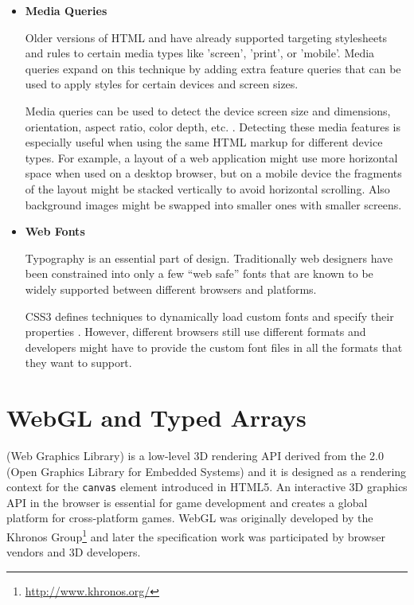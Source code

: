 \begin{itemize}
\item \textbf{Media Queries}

  Older versions of HTML and  have already supported targeting
  stylesheets and rules to certain media types like 'screen', 'print',
  or 'mobile'. Media queries expand on this technique by adding extra
  feature queries that can be used to apply styles for certain devices
  and screen sizes. \cite{mediaqueries}

  Media queries can be used to detect the device screen size and
  dimensions, orientation, aspect ratio, color depth,
  etc. \cite{mediaqueries}. Detecting these media features is especially
  useful when using the same HTML markup for different device types. For
  example, a layout of a web application might use more horizontal space
  when used on a desktop browser, but on a mobile device the fragments
  of the layout might be stacked vertically to avoid horizontal
  scrolling. Also background images might be swapped into smaller ones
  with smaller screens.

\item \textbf{Web Fonts}

  Typography is an essential part of design. Traditionally web designers
  have been constrained into only a few ``web safe'' fonts that are
  known to be widely supported between different browsers and platforms.

  CSS3 defines techniques to dynamically load custom fonts and specify
  their properties \cite{cssfonts}. However, different browsers still
  use different formats and developers might have to provide the custom
  font files in all the formats that they want to support.

\end{itemize}

\section{WebGL and Typed Arrays}

 (Web Graphics Library) is a low-level 3D rendering API
derived from the  2.0 (Open Graphics Library for
Embedded Systems) \cite{OpenGL} and it is designed as a rendering
context for the \texttt{canvas} element introduced in HTML5. An
interactive 3D graphics API in the browser is essential for game
development and creates a global platform for cross-platform
games. WebGL was originally developed by the Khronos
Group\footnote{\url{http://www.khronos.org/}} and later the
specification work was participated by browser vendors and 3D
developers. \cite{WebGL}

